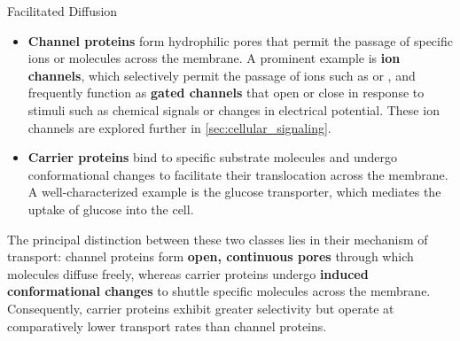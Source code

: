 \documentclass[10pt]{article}
\begin{document}
    \begin{core}{Facilitated Diffusion}


      \begin{itemize}

        \item \textbf{Channel proteins} form hydrophilic pores that permit the passage of specific ions or molecules across the membrane. A prominent example is \textbf{ion channels}, which selectively permit the passage of ions such as  or , and frequently function as \textbf{gated channels} that open or close in response to stimuli such as chemical signals or changes in electrical potential. These ion channels are explored further in \autoref{sec:cellular_signaling}.

        \item \textbf{Carrier proteins} bind to specific substrate molecules and undergo conformational changes to facilitate their translocation across the membrane. A well-characterized example is the glucose transporter, which mediates the uptake of glucose into the cell.

      \end{itemize}

      The principal distinction between these two classes lies in their mechanism of transport: channel proteins form \textbf{open, continuous pores} through which molecules diffuse freely, whereas carrier proteins undergo \textbf{induced conformational changes} to shuttle specific molecules across the membrane. Consequently, carrier proteins exhibit greater selectivity but operate at comparatively lower transport rates than channel proteins.

    \end{core}
\end{document}
